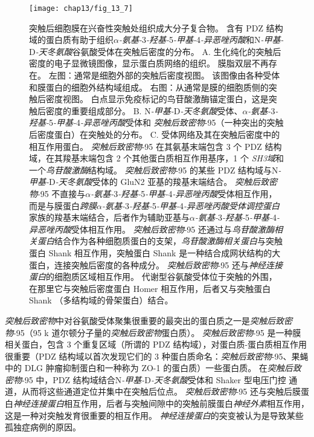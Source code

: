 \begin{figure}[htbp]
	\centering
	\texttt{[image: chap13/fig\_13\_7]}
	\caption{突触后细胞膜在兴奋性突触处组织成大分子复合物。
		含有 PDZ 结构域的蛋白质有助于组织\textit{$\alpha$-氨基-}3\textit{-羟基-}5\textit{-甲基-}4\textit{-异恶唑丙酸}和N\textit{-甲基-}D\textit{-天冬氨酸}谷氨酸受体在突触后密度的分布\cite{sheng2007postsynaptic}。
		A. 生化纯化的突触后密度的电子显微镜图像，显示蛋白质网络的组织。
		膜脂双层不再存在。
		左图：通常是细胞外部的突触后密度视图。
		该图像由各种受体和膜蛋白的细胞外结构域组成。
		右图：从通常是膜的细胞质侧的突触后密度视图。
		白点显示免疫标记的鸟苷酸激酶锚定蛋白，这是突触后密度的重要组成部分。
		B. N\textit{-甲基-}D\textit{-天冬氨酸}受体、\textit{$\alpha$-氨基-}3\textit{-羟基-}5\textit{-甲基-}4\textit{-异恶唑丙酸}受体和 \textit{突触后致密物}-95（一种突出的突触后密度蛋白）在突触处的分布。
		C. 受体网络及其在突触后密度中的相互作用蛋白。
		\textit{突触后致密物}-95 在其氨基末端包含 3 个 PDZ 结构域，在其羧基末端包含 2 个其他蛋白质相互作用基序，1 个 \textit{SH3域}和一个\textit{鸟苷酸激酶}结构域。
		\textit{突触后致密物}-95 的某些 PDZ 结构域与N\textit{-甲基-}D\textit{-天冬氨酸}受体的 GluN2 亚基的羧基末端结合。
		\textit{突触后致密物}-95 不直接与\textit{$\alpha$-氨基-}3\textit{-羟基-}5\textit{-甲基-}4\textit{-异恶唑丙酸}受体相互作用，而是与膜蛋白\textit{跨膜$\alpha$-氨基-}3\textit{-羟基-}5\textit{-甲基-}4\textit{-异恶唑丙酸受体调控蛋白}家族的羧基末端结合，后者作为辅助亚基与\textit{$\alpha$-氨基-}3\textit{-羟基-}5\textit{-甲基-}4\textit{-异恶唑丙酸}受体相互作用。
		\textit{突触后致密物}-95 还通过与\textit{鸟苷酸激酶相关蛋白}结合作为各种细胞质蛋白的支架，\textit{鸟苷酸激酶相关蛋白}与突触蛋白 Shank 相互作用，突触蛋白 Shank 是一种结合成网状结构的大蛋白，连接突触后密度的各种成分。
		\textit{突触后致密物}-95 还与\textit{神经连接蛋白}的细胞质区域相互作用。
		代谢型谷氨酸受体位于突触的外围，在那里它与突触后密度蛋白 Homer 相互作用，后者又与突触蛋白 Shank （多结构域的骨架蛋白）结合。}
	\label{fig:13_7}
\end{figure}


\textit{突触后致密物}中对谷氨酸受体聚集很重要的最突出的蛋白质之一是\textit{突触后致密物}-95（95 k 道尔顿分子量的\textit{突触后致密物}蛋白质）。
\textit{突触后致密物}-95 是一种膜相关蛋白，包含 3 个重复区域（所谓的 PDZ 结构域），对蛋白质-蛋白质相互作用很重要（PDZ 结构域以首次发现它们的 3 种蛋白质命名：\textit{突触后致密物}-95、果蝇中的 DLG 肿瘤抑制蛋白和一种称为 ZO-1 的蛋白质）一些蛋白质。
在\textit{突触后致密物}-95 中，PDZ 结构域结合N\textit{-甲基-}D\textit{-天冬氨酸}受体和 Shaker 型电压门控  通道，从而将这些通道定位并集中在突触后位点。
\textit{突触后致密物}-95 还与突触后膜蛋白\textit{神经连接蛋白}相互作用，后者与突触间隙中的突触前膜蛋白\textit{神经外素}相互作用，这是一种对突触发育很重要的相互作用。
\textit{神经连接蛋白}的突变被认为是导致某些孤独症病例的原因。


